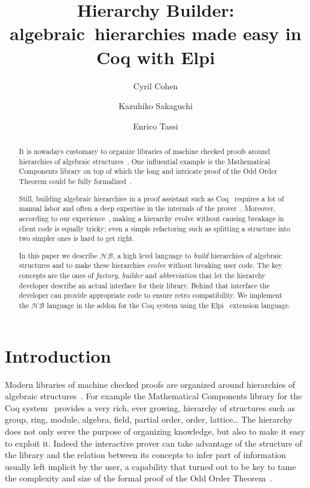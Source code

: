 \documentclass[a4paper,UKenglish,cleveref, autoref]{lipics-v2019}
\title{Hierarchy Builder: algebraic~hierarchies made easy in Coq with Elpi} %
\author{Cyril Cohen}{Inria, France}{Cyril.Cohen@inria.fr}{}{}
\author{Kazuhiko Sakaguchi}{University of Tsukuba, Japan}{sakaguchi@logic.cs.tsukuba.ac.jp}{}{}
\author{Enrico Tassi}{Inria, France}{Enrico.Tassi@inria.fr}{}{}
\newcommand{\HB}{\ensuremath{\mathcal{HB}}}
\newcommand{\hb}{\coq{hierarchy-builder}}
\newcommand{\factory}{factory}
\newcommand{\phantterm}{abbreviation}
\newcommand{\mixinbuilder}{builder}
\theoremstyle{implem}
\theoremstyle{implem}
\theoremstyle{command}
\begin{document}
\maketitle

\begin{abstract}
It is nowadays customary to organize libraries of machine checked
proofs around hierarchies of algebraic
structures~\cite{DBLP:conf/mpc/AffeldtNS19,DBLP:journals/mics/BoldoLM15,Cohen_phd,Holzl:2013,10.1145/3372885.3373824,Rouhling_phd,mathclasses}.
One influential example is the Mathematical Components library on top
of which the long and intricate proof of the Odd Order
Theorem could be fully formalized~\cite{DBLP:conf/itp/GonthierAABCGRMOBPRSTT13}.

Still, building algebraic hierarchies in a proof assistant such as Coq~\cite{Coq:manual}
requires a lot of manual labor and often a deep expertise in the internals of
the prover~\cite{DBLP:conf/tphol/GarillotGMR09,DBLP:conf/itp/MahboubiT13}.
Moreover, according to our experience~\cite{KSdraft},
making a hierarchy evolve without causing breakage in client code is equally tricky:
even a simple refactoring such as splitting a structure into two simpler ones
is hard to get right.

In this paper we describe \HB{}, a high level language
to \emph{build} hierarchies of algebraic structures and to make these hierarchies
\emph{evolve} without breaking user code. The key concepts are the ones of
\emph{\factory{}}, \emph{\mixinbuilder{}} and \emph{\phantterm{}} that let the hierarchy developer
describe an actual
interface for their library. Behind that interface the developer can provide
appropriate code to ensure retro compatibility.
We implement the \HB{} language in the \hb{} addon for the Coq
system using the Elpi~\cite{DBLP:conf/lpar/DunchevGCT15,CoqElpi}
extension language.
\end{abstract}

\section{Introduction}

Modern libraries of machine checked proofs are organized around
hierarchies of algebraic structures~\cite{DBLP:conf/mpc/AffeldtNS19,DBLP:journals/mics/BoldoLM15,Cohen_phd,Holzl:2013,10.1145/3372885.3373824,Rouhling_phd,mathclasses}.
For example the Mathematical Components library for the Coq system~\cite{Coq:manual}
provides a very rich, ever growing, hierarchy of structures such as
group, ring, module, algebra, field, partial order, order, lattice\ldots
The hierarchy does not only serve the purpose of organizing knowledge, but
also to make it easy to exploit it. Indeed the interactive prover can
take advantage of the structure of the library and the relation between
its concepts to infer part of information usually left implicit
by the user, a capability that turned out to be key to tame
the complexity and size of the formal proof of the Odd Order
Theorem~\cite{DBLP:conf/itp/GonthierAABCGRMOBPRSTT13}.
\end{document}
